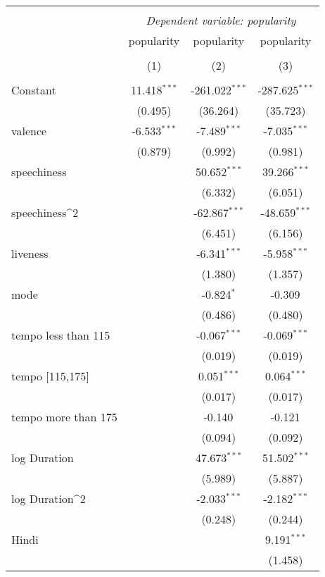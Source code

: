 \begin{table}[!htbp] \centering
\begin{tabular}{@{\extracolsep{5pt}}lccc}
\\[-1.8ex]\hline
\hline \\[-1.8ex]
& \multicolumn{3}{c}{\textit{Dependent variable: popularity}} \
\cr \cline{2-4}
\\[-1.8ex] & \multicolumn{1}{c}{popularity} & \multicolumn{1}{c}{popularity} & \multicolumn{1}{c}{popularity}  \\
\\[-1.8ex] & (1) & (2) & (3) \\
\hline \\[-1.8ex]
 Constant & 11.418$^{***}$ & -261.022$^{***}$ & -287.625$^{***}$ \\
& (0.495) & (36.264) & (35.723) \\
 valence & -6.533$^{***}$ & -7.489$^{***}$ & -7.035$^{***}$ \\
& (0.879) & (0.992) & (0.981) \\
 speechiness & & 50.652$^{***}$ & 39.266$^{***}$ \\
& & (6.332) & (6.051) \\
 speechiness^2 & & -62.867$^{***}$ & -48.659$^{***}$ \\
& & (6.451) & (6.156) \\
 liveness & & -6.341$^{***}$ & -5.958$^{***}$ \\
& & (1.380) & (1.357) \\
 mode & & -0.824$^{*}$ & -0.309$^{}$ \\
& & (0.486) & (0.480) \\
 tempo less than 115 & & -0.067$^{***}$ & -0.069$^{***}$ \\
& & (0.019) & (0.019) \\
 tempo [115,175] & & 0.051$^{***}$ & 0.064$^{***}$ \\
& & (0.017) & (0.017) \\
 tempo more than 175 & & -0.140$^{}$ & -0.121$^{}$ \\
& & (0.094) & (0.092) \\
 log Duration & & 47.673$^{***}$ & 51.502$^{***}$ \\
& & (5.989) & (5.887) \\
 log Duration^2 & & -2.033$^{***}$ & -2.182$^{***}$ \\
& & (0.248) & (0.244) \\
 Hindi & & & 9.191$^{***}$ \\
& & & (1.458) \\

\end{tabular}
\end{table}
